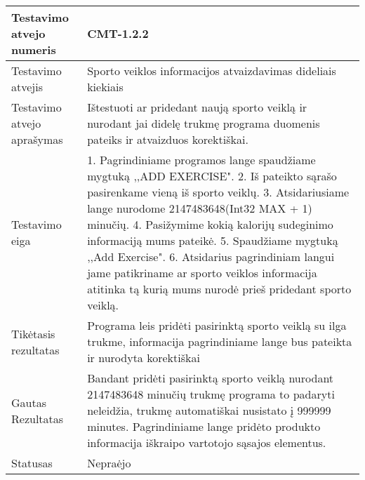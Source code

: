 \documentclass[oneside]{VUMIFPSkursinis}
\begin{document}
\begin{center}
    \begin{tabular}{ |p{5cm}|p{13cm}|}
    \hline
    	Testavimo atvejo numeris & CMT-1.2.2  \\ \hline
    	Testavimo atvejis & Sporto veiklos informacijos atvaizdavimas dideliais kiekiais  \\ \hline
	Testavimo atvejo aprašymas & Ištestuoti ar pridedant naują sporto veiklą ir nurodant jai didelę trukmę programa duomenis pateiks ir atvaizduos korektiškai.  \\ \hline
	Testavimo eiga & 1. Pagrindiniame programos lange spaudžiame mygtuką ,,ADD EXERCISE". 
				2. Iš pateikto sąrašo pasirenkame vieną iš sporto veiklų. 
				3. Atsidariusiame lange nurodome 2147483648(Int32 MAX + 1) minučių.
				4. Pasižymime kokią kalorijų sudeginimo informaciją mums pateikė.
				5. Spaudžiame mygtuką ,,Add Exercise".
				6. Atsidarius pagrindiniam langui jame patikriname ar sporto veiklos informacija atitinka tą kurią mums nurodė prieš pridedant sporto veiklą.\\ \hline
	Tikėtasis rezultatas & Programa leis pridėti pasirinktą sporto veiklą su ilga trukme, informacija pagrindiniame lange bus pateikta ir nurodyta korektiškai  \\ \hline
	Gautas Rezultatas & Bandant pridėti pasirinktą sporto veiklą nurodant 2147483648 minučių trukmę programa to padaryti neleidžia, trukmę automatiškai nusistato į 999999 minutes. Pagrindiniame lange pridėto produkto informacija iškraipo vartotojo sąsajos elementus.  \\ \hline
	Statusas & Nepraėjo  \\ \hline
    \hline
    \end{tabular}
\end{center}
\end{document}
